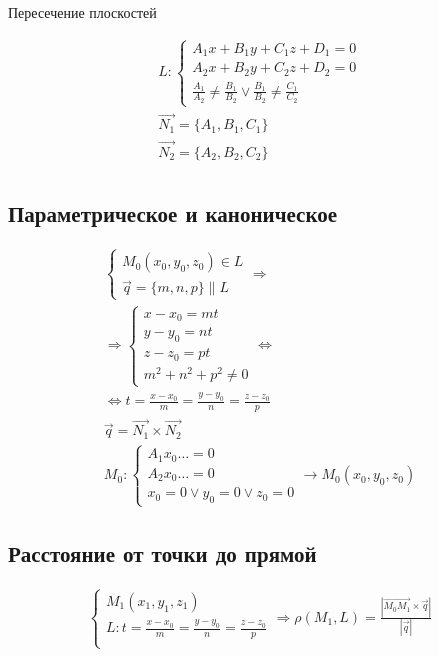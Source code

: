 \documentclass{article}
\begin{document}
Пересечение плоскостей

\begin{gather*}
	L : \begin{cases}
		A_1x + B_1y + C_1z + D_1 = 0 \\
		A_2x + B_2y + C_2z + D_2 = 0 \\
		\frac{A_1}{A_2} \ne \frac{B_1}{B_2} \lor \frac{B_1}{B_2} \ne \frac{C_1}{C_2}
	\end{cases} \\
	\vec{N_1} = \{ A_1, B_1, C_1 \} \\
	\vec{N_2} = \{ A_2, B_2, C_2 \} \\
\end{gather*}

\subsection{Параметрическое и каноническое}

\begin{gather*}
	\begin{cases}
		M_0(x_0, y_0, z_0) \in L \\
		\vec{q} = \{ m, n, p \} \parallel L
	\end{cases} \Rightarrow \\
	\Rightarrow \begin{cases}
		x - x_0 = mt \\
		y - y_0 = nt \\
		z - z_0 = pt \\
		m^2 + n^2 + p^2 \ne 0
	\end{cases} \Leftrightarrow \\
	\Leftrightarrow t = \frac{x - x_0}{m} = \frac{y - y_0}{n} = \frac{z - z_0}{p} \\
	\vec{q} = \vec{N_1} \times \vec{N_2} \\
	M_0 : \begin{cases}
		A_1x_0 \dots = 0 \\
		A_2x_0 \dots = 0 \\
		x_0 = 0 \lor y_0 = 0 \lor z_0 = 0
	\end{cases} \rightarrow M_0(x_0, y_0, z_0)
\end{gather*}

\subsection{Расстояние от точки до прямой}

\begin{gather*}
	\begin{cases}
		M_1(x_1, y_1, z_1) \\
		L: t = \frac{x - x_0}{m} = \frac{y - y_0}{n} = \frac{z - z_0}{p} \\
	\end{cases} \Rightarrow
	\rho(M_1, L) = \frac{|\vec{M_0 M_1} \times \vec{q}|}{|\vec{q}|}
\end{gather*}
\end{document}
